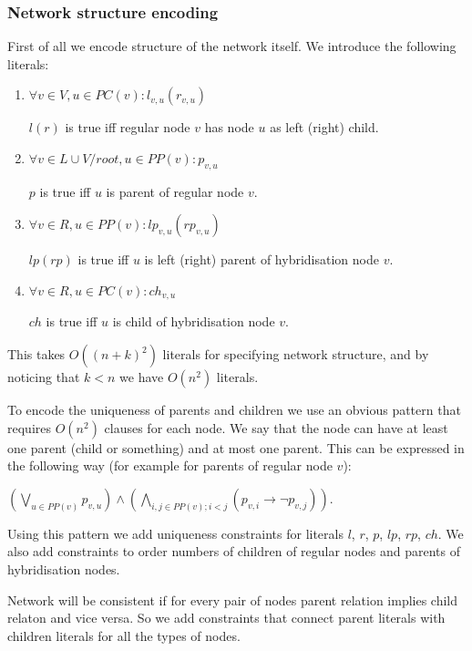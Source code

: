 \documentclass[runningheads, envcountsame, a4paper]{llncs}
\begin{document}
\subsubsection{Network structure encoding} 

First of all we encode structure of the network itself. We introduce the following literals: 

\begin{enumerate}

\item $\forall v \in V, u \in PC(v) : l_{v,u}(r_{v,u})$ 

$l (r)$ is true iff regular node $v$ has node $u$ as left (right) child.

\item $\forall v \in L \cup V / root, u \in PP(v) : p_{v,u}$ 

$p$ is true iff $u$ is parent of regular node $v$.

\item $\forall v \in R, u \in PP(v) : lp_{v,u}(rp_{v,u})$ 

$lp (rp)$ is true iff $u$ is left (right) parent of hybridisation node $v$.

\item $\forall v \in R, u \in PC(v) : ch_{v,u}$ 

$ch$ is true iff $u$ is child of hybridisation node $v$.

\end{enumerate}

This takes $O((n + k)^2)$ literals for specifying network structure, and by noticing that $k < n$ we have $O(n^2)$ literals.

To encode the uniqueness of parents and children we use an obvious pattern that requires $O(n^2)$ clauses for each node. We say 
that the node can have at least one parent (child or something) and at most one parent. This can be expressed 
in the following way (for example for parents of regular node $v$): 

$(\bigvee\limits_{u \in PP(v)} p_{v,u}) \wedge (\bigwedge\limits_{i, j \in PP(v);i < j} (p_{v,i} \rightarrow \neg p_{v,j}))$.

Using this pattern we add uniqueness constraints for literals $l$, $r$, $p$, $lp$, $rp$, $ch$. We also add constraints to order numbers of children of regular nodes and parents of hybridisation nodes.

Network will be consistent if for every pair of nodes parent relation implies child relaton and vice versa. So we add constraints that connect parent literals with children literals for all the types of nodes.
\end{document}
